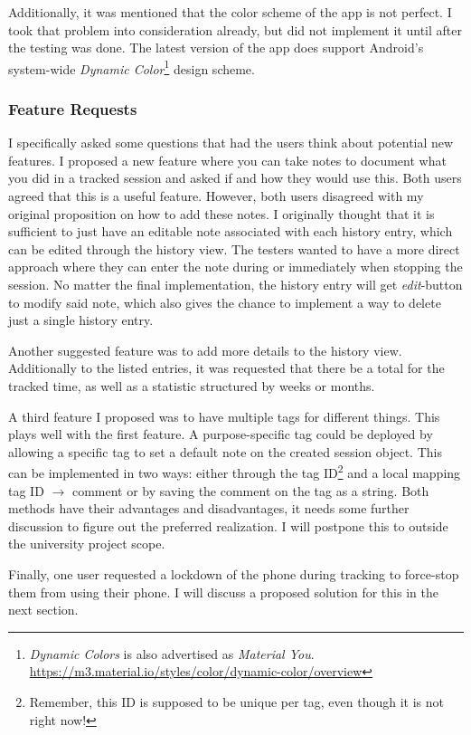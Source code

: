 \documentclass[conference]{IEEEtran}
\begin{document}
Additionally, it was mentioned that the color scheme of the app is not perfect. I took that problem into consideration already, but did not implement it until after the testing was done. The latest version of the app does support Android's system-wide \textit{Dynamic Color}\footnote{\textit{Dynamic Colors} is also advertised as \textit{Material You}. \url{https://m3.material.io/styles/color/dynamic-color/overview}} design scheme.

\subsubsection{Feature Requests}
I specifically asked some questions that had the users think about potential new features. I proposed a new feature where you can take notes to document what you did in a tracked session and asked if and how they would use this. Both users agreed that this is a useful feature. However, both users disagreed with my original proposition on how to add these notes. I originally thought that it is sufficient to just have an editable note associated with each history entry, which can be edited through the history view. The testers wanted to have a more direct approach where they can enter the note during or immediately when stopping the session. No matter the final implementation, the history entry will get \textit{edit}-button to modify said note, which also gives the chance to implement a way to delete just a single history entry.

Another suggested feature was to add more details to the history view. Additionally to the listed entries, it was requested that there be a total for the tracked time, as well as a statistic structured by weeks or months.

A third feature I proposed was to have multiple tags for different things. This plays well with the first feature. A purpose-specific tag could be deployed by allowing a specific tag to set a default note on the created session object. This can be implemented in two ways: either through the tag ID\footnote{Remember, this ID is supposed to be unique per tag, even though it is not right now!} and a local mapping tag ID $\to$ comment or by saving the comment on the tag as a string. Both methods have their advantages and disadvantages, it needs some further discussion to figure out the preferred realization. I will postpone this to outside the  university project scope.

Finally, one user requested a lockdown of the phone during tracking to force-stop them from using their phone. I will discuss a proposed solution for this in the next section.
\end{document}
